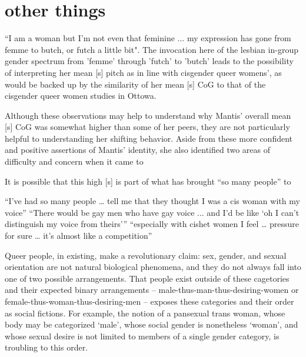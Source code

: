




\section{other things}
``I am a woman but I'm not even that feminine ... my expression has gone from femme to butch, or futch a little bit". The invocation here of the lesbian in-group gender spectrum from 'femme' through 'futch' to 'butch' leads to the possibility of interpreting her mean [s] pitch as in line with cisgender queer womens', as would be backed up by the similarity of her mean [s] CoG to that of the cisgender queer women \textcite{hazenberg_language_2012} studies in Ottowa.

Although these observations may help to understand why Mantis' overall mean [s] CoG was somewhat higher than some of her peers, they are not particularly helpful to understanding her shifting behavior. Aside from these more confident and positive assertions of Mantis' identity, she also identified two areas of difficulty and concern when it came to


 It is possible that this high [s] is part of what has brought ``so many people'' to



“I've had so many people … tell me that they thought I was a cis woman with my voice”
“There would be gay men who have gay voice ... and I'd be like ‘oh I can't distinguish my voice from theirs’”
“especially with cishet women I feel … pressure for sure … it’s almost like a competition”

	
	

Queer people, in existing, make a revolutionary claim: sex, gender, and sexual orientation are not natural biological phenomena, and they do not always fall into one of two possible arrangements. That people exist outside of these cagetories and their expected binary arrangements -- male-thus-man-thus-desiring-women or female-thus-woman-thus-desiring-men -- exposes these categories and their order as social fictions. For example, the notion of a pansexual trans woman, whose body may be categorized `male', whose social gender is nonetheless `woman', and whose sexual desire is not limited to members of a single gender category, is troubling to this order.

